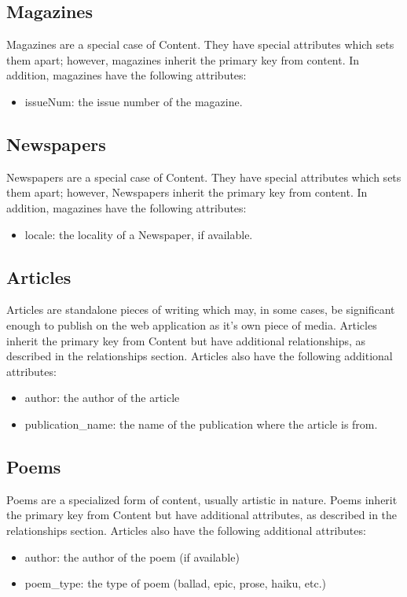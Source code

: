 \documentclass[letter, 12pt, titlepage]{article}
\begin{document}
		\subsection{Magazines}
			Magazines are a special case of Content. They have special attributes which sets them apart; however, magazines inherit the primary key from content. In addition, magazines have the following attributes:
			\begin{itemize}
				\item issueNum: the issue number of the magazine.
			\end{itemize}		
		\subsection{Newspapers} 
				Newspapers are a special case of Content. They have special attributes which sets them apart; however, Newspapers inherit the primary key from content. In addition, magazines have the following attributes:
			\begin{itemize}
				\item locale: the locality of a Newspaper, if available.
			\end{itemize}	
		\subsection{Articles}		
			Articles are standalone pieces of writing which may, in some cases, be significant enough to publish on the web application as it's own piece of media. Articles inherit the primary key from Content but have additional relationships, as described in the relationships section. Articles also have the following additional attributes:
			\begin{itemize}
				\item author: the author of the article
				\item publication\_name: the name of the publication where the article is from.
			\end{itemize}
		\subsection{Poems}		
			Poems are a specialized form of content, usually artistic in nature. Poems inherit the primary key from Content but have additional attributes, as described in the relationships section. Articles also have the following additional attributes:
			\begin{itemize}
				\item author: the author of the poem (if available)
				\item poem\_type: the type of poem (ballad, epic, prose, haiku, etc.)
			\end{itemize}
\end{document}
